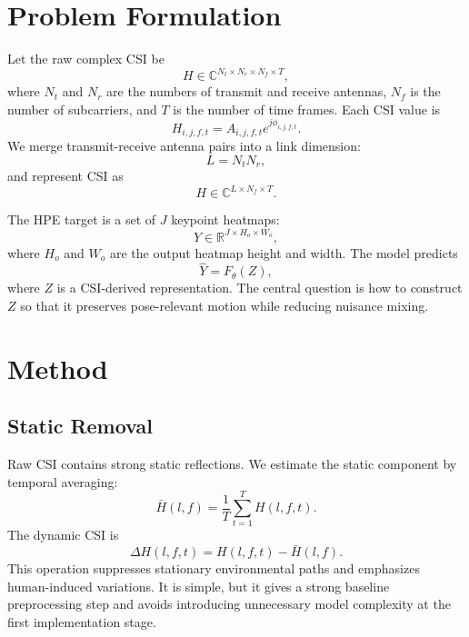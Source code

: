 \documentclass[10pt,journal]{IEEEtran}
\begin{document}
\section{Problem Formulation}

Let the raw complex CSI be
\begin{equation}
    H\in\mathbb{C}^{N_t\times N_r\times N_f\times T},
\end{equation}
where $N_t$ and $N_r$ are the numbers of transmit and receive antennas, $N_f$ is the number of subcarriers, and $T$ is the number of time frames. Each CSI value is
\begin{equation}
    H_{i,j,f,t}=A_{i,j,f,t}e^{j\phi_{i,j,f,t}}.
\end{equation}
We merge transmit-receive antenna pairs into a link dimension:
\begin{equation}
    L=N_tN_r,
\end{equation}
and represent CSI as
\begin{equation}
    H\in\mathbb{C}^{L\times N_f\times T}.
\end{equation}

The HPE target is a set of $J$ keypoint heatmaps:
\begin{equation}
    Y\in\mathbb{R}^{J\times H_o\times W_o},
\end{equation}
where $H_o$ and $W_o$ are the output heatmap height and width. The model predicts
\begin{equation}
    \hat{Y}=F_\theta(Z),
\end{equation}
where $Z$ is a CSI-derived representation. The central question is how to construct $Z$ so that it preserves pose-relevant motion while reducing nuisance mixing.

\section{Method}

\subsection{Static Removal}

Raw CSI contains strong static reflections. We estimate the static component by temporal averaging:
\begin{equation}
    \bar{H}(l,f)=\frac{1}{T}\sum_{t=1}^{T}H(l,f,t).
\end{equation}
The dynamic CSI is
\begin{equation}
    \Delta H(l,f,t)=H(l,f,t)-\bar{H}(l,f).
\end{equation}
This operation suppresses stationary environmental paths and emphasizes human-induced variations. It is simple, but it gives a strong baseline preprocessing step and avoids introducing unnecessary model complexity at the first implementation stage.
\end{document}
